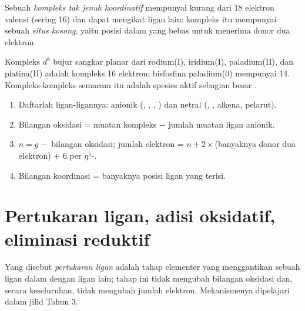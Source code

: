 \begin{definition}\label{def:b2:catalytic-cycles:unsaturated}
Sebuah \emph{kompleks tak jenuh koordinatif}
mempunyai kurang dari 18 elektron valensi (sering 16) dan dapat mengikat
ligan lain: kompleks itu mempunyai sebuah \emph{situs kosong},
yaitu posisi dalam  yang bebas untuk menerima donor dua
elektron.
\end{definition}

Kompleks $d^8$ bujur sangkar planar dari rodium(I), iridium(I), paladium(II),
dan platina(II) adalah kompleks 16 elektron; bisfosfina paladium(0) 
mempunyai 14. Kompleks-kompleks semacam itu adalah spesies aktif sebagian
besar .

\begin{method}\label{met:b2:catalytic-cycles:count-organometallic}
\begin{enumerate}
  \item Daftarlah ligan-ligannya: anionik (, , , ) dan netral
        (, , alkena, pelarut).
  \item Bilangan oksidasi = muatan kompleks $-$ jumlah muatan ligan anionik.
  \item $n = g -$ bilangan oksidasi; jumlah elektron = $n + 2 \times$(banyaknya donor dua elektron)
        $+$ 6 per $\eta^5$-.
  \item Bilangan koordinasi = banyaknya posisi ligan yang terisi.
\end{enumerate}
\end{method}

\section{Pertukaran ligan, adisi oksidatif, eliminasi reduktif}

\begin{definition}\label{def:b2:catalytic-cycles:ligand-exchange}
Yang disebut \emph{pertukaran ligan} adalah tahap
elementer yang menggantikan sebuah ligan dalam  dengan ligan
lain; tahap ini tidak mengubah bilangan oksidasi dan, secara keseluruhan,
tidak mengubah jumlah elektron. Mekanismenya dipelajari dalam jilid Tahun 3.
\end{definition}


